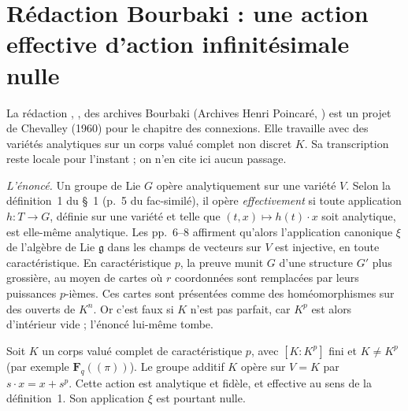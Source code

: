 \section[Rédaction Bourbaki \redac{334} : effectivité et action infinitésimale en caractéristique $p$]{Rédaction Bourbaki  : une action effective d'action infinitésimale nulle\protect\piste\protect{}}\label{sec:bourbaki-334}

La rédaction , , des archives Bourbaki (Archives Henri Poincaré, ) est un projet de Chevalley (1960) pour le chapitre des connexions. Elle travaille avec des variétés analytiques sur un corps valué complet non discret $K$. Sa transcription reste locale pour l'instant ; on n'en cite ici aucun passage.

\emph{L'énoncé.} Un groupe de Lie $G$ opère analytiquement sur une variété $V$. Selon la définition~1 du §~1 (p.~5 du fac-similé), il opère \emph{effectivement} si toute application $h : T \to G$, définie sur une variété et telle que $(t,x) \mapsto h(t)\cdot x$ soit analytique, est elle-même analytique. Les pp.~6--8 affirment qu'alors l'application canonique $\xi$ de l'algèbre de Lie $\mathfrak g$ dans les champs de vecteurs sur $V$ est injective, en toute caractéristique. En caractéristique $p$, la preuve munit $G$ d'une structure $G'$ plus grossière, au moyen de cartes où $r$ coordonnées sont remplacées par leurs puissances $p$-ièmes. Ces cartes sont présentées comme des homéomorphismes sur des ouverts de $K^n$. Or c'est faux si $K$ n'est pas parfait, car $K^p$ est alors d'intérieur vide ; l'énoncé lui-même tombe.

\begin{encadre}
\begin{contrexemple}
Soit $K$ un corps valué complet de caractéristique $p$, avec $[K : K^p]$ fini et $K \neq K^p$ (par exemple $\mathbf F_q((\pi))$). Le groupe additif $K$ opère sur $V = K$ par $s \cdot x = x + s^p$. Cette action est analytique et fidèle, et effective au sens de la définition~1. Son application $\xi$ est pourtant nulle.
\end{contrexemple}
\end{encadre}

